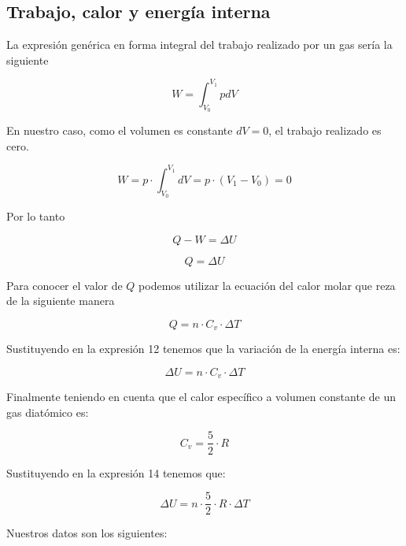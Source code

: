 \documentclass{article}
\begin{document}
\subsection{Trabajo, calor y energía interna}

La expresión genérica en forma integral del trabajo realizado por un gas sería la siguiente

\begin{equation}
    W = \int_{V_0}^{V_1} p dV    
\end{equation}

En nuestro caso, como el volumen es constante \(dV = 0\), el trabajo realizado es cero.

\begin{equation}
    W = p \cdot \int_{V_0}^{V_1} dV = p \cdot (V_1 - V_0) = 0
\end{equation}

Por lo tanto 

\begin{equation}
    Q - W = \Delta U
\end{equation}

\begin{equation}
    Q = \Delta U
\end{equation}

Para conocer el valor de \(Q\) podemos utilizar la ecuación del calor molar que reza de la siguiente manera

\begin{equation}
    Q = n \cdot C_v \cdot \Delta T
\end{equation}

Sustituyendo en la expresión 12 tenemos que la variación de la energía interna es:

\begin{equation}
    \Delta U = n \cdot C_v \cdot \Delta T
\end{equation}

Finalmente teniendo en cuenta que el calor específico a volumen constante de un gas diatómico es:

\begin{equation}
    C_v = \frac{5}{2} \cdot R
\end{equation}

Sustituyendo en la expresión 14 tenemos que:

\begin{equation}
    \Delta U = n \cdot \frac{5}{2} \cdot R \cdot \Delta T
\end{equation}

Nuestros datos son los siguientes:
\end{document}
